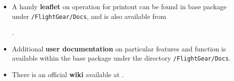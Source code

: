 \begin{itemize}
 \item A handy \textbf{leaflet} on operation for printout can be found in base package under \texttt{/FlightGear/Docs}, and is also available from

.

 \item Additional \textbf{user documentation} on particular features and function is available within the
base package under the directory \texttt{/FlightGear/Docs}.

 \item There is an official \FlightGear{} \textbf{wiki} available at .
 \end{itemize}

